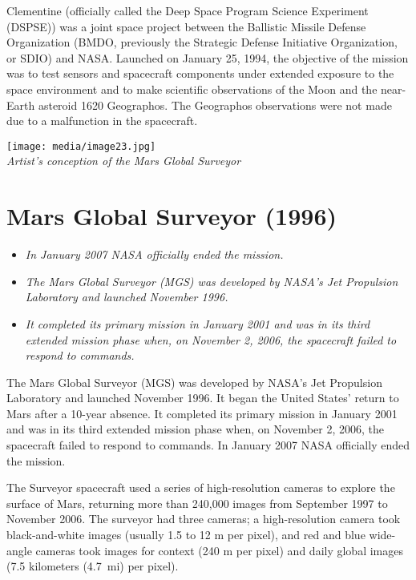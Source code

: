 Clementine (officially called the Deep Space Program Science Experiment
(DSPSE)) was a joint space project between the Ballistic Missile Defense
Organization (BMDO, previously the Strategic Defense Initiative
Organization, or SDIO) and NASA. Launched on January 25, 1994, the
objective of the mission was to test sensors and spacecraft components
under extended exposure to the space environment and to make scientific
observations of the Moon and the near-Earth asteroid 1620 Geographos.
The Geographos observations were not made due to a malfunction in the
spacecraft.

\texttt{[image: media/image23.jpg]}\\
\emph{Artist's conception of the Mars Global Surveyor}

\section{Mars Global Surveyor (1996)}\label{mars-global-surveyor-1996}

\begin{itemize}
\item
  \emph{In January 2007 NASA officially ended the mission.}
\item
  \emph{The Mars Global Surveyor (MGS) was developed by NASA's Jet
  Propulsion Laboratory and launched November 1996.}
\item
  \emph{It completed its primary mission in January 2001 and was in its
  third extended mission phase when, on November 2, 2006, the spacecraft
  failed to respond to commands.}
\end{itemize}

The Mars Global Surveyor (MGS) was developed by NASA's Jet Propulsion
Laboratory and launched November 1996. It began the United States'
return to Mars after a 10-year absence. It completed its primary mission
in January 2001 and was in its third extended mission phase when, on
November 2, 2006, the spacecraft failed to respond to commands. In
January 2007 NASA officially ended the mission.

The Surveyor spacecraft used a series of high-resolution cameras to
explore the surface of Mars, returning more than 240,000 images from
September 1997 to November 2006. The surveyor had three cameras; a
high-resolution camera took black-and-white images (usually 1.5 to 12 m
per pixel), and red and blue wide-angle cameras took images for context
(240 m per pixel) and daily global images (7.5 kilometers (4.7~mi) per
pixel).

